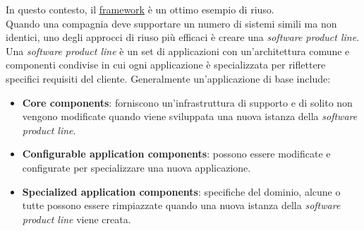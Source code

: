 			In questo contesto, il \underline{\hyperref[framework]{framework}} è un ottimo esempio di riuso. \\
			Quando una compagnia deve supportare un numero di sistemi simili ma non identici, uno degli approcci di riuso più efficaci è creare una \textit{software product line}.
			Una \textit{software product line} è un set di applicazioni con un'architettura comune e componenti condivise in cui ogni applicazione è specializzata per riflettere specifici requisiti del cliente.  Generalmente un'applicazione di base include:
		 	\begin{itemize}
		 		\item \textbf{Core components}: forniscono un'infrastruttura di supporto e di solito non vengono modificate quando viene sviluppata una nuova istanza della \textit{software product line}.
		 		\item \textbf{Configurable application components}: possono essere modificate e configurate per specializzare una nuova applicazione.
		 		\item \textbf{Specialized application components}: specifiche del dominio, alcune o tutte possono essere rimpiazzate quando una nuova istanza della \textit{software product line} viene creata.
		 	\end{itemize}

